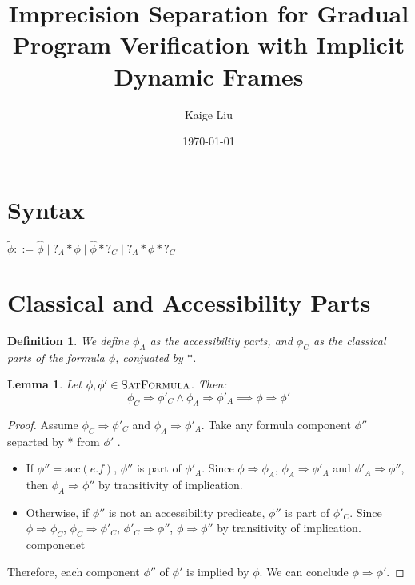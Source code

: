 \documentclass {article}
\title{Imprecision Separation for Gradual Program Verification with Implicit Dynamic Frames}
\author {Kaige Liu}
\date {\today}
\newtheorem{lemma}[theorem]{Lemma}
\newtheorem{definition}[theorem]{Definition}
\newcommand{\fphi}{\widehat{\phi}}
\newcommand{\tphi}{\widetilde{\phi}}
\newcommand{\acc}[1]{\text{acc}(#1)}
\newcommand{\imp}{\Rightarrow}
\newcommand{\satdef}{\textsc{SatFormula}}
\begin{document}
\maketitle
\section{Syntax}
$\tphi ::= \fphi \mid ?_A \ast \phi \mid \fphi \ast ?_C \mid  ?_A \ast \phi \ast ?_C$\\
\section{Classical and Accessibility Parts}
\begin{definition}
\label{def_AC}
We define $\phi_A$ as the accessibility parts, and $\phi_C$ as the classical parts of the formula $\phi$, conjuated by $\ast$.
\end{definition}

\begin{lemma}
\label{lemma_AC}
Let $\phi, \phi' \in \satdef$. Then:
$$\phi_C \Rightarrow \phi'_C \wedge \phi_A \Rightarrow \phi'_A \implies \phi \Rightarrow \phi'$$
\end{lemma}

\begin{proof}
	Assume $\phi_C \Rightarrow \phi'_C$ and $\phi_A \Rightarrow \phi'_A$. Take any formula component $\phi''$ separted by *  from $\phi'$ . 
\begin{itemize}
	\item If $\phi'' = \acc{e.f}$, $\phi''$ is part of $\phi'_A$. Since $\phi \imp \phi_A$, $\phi_A \imp \phi'_A$ and $\phi'_A \imp \phi''$, then $\phi_A \imp \phi''$ by transitivity of implication.  
	\item Otherwise, if $\phi''$ is not an accessibility predicate, $\phi''$ is part of $\phi'_C$. Since $\phi \imp \phi_C$, $\phi_C \imp \phi'_C$, $\phi'_C \imp \phi''$, $\phi \imp \phi''$ by transitivity of implication.  componenet 
\end{itemize}	
Therefore, each component $\phi''$ of $\phi'$ is implied by $\phi$. We can conclude $\phi \imp \phi'$.
\end{proof}
\end{document}
